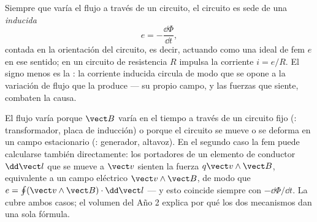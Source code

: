 \begin{theorem}\label{thm:b1:induction:faraday}
Siempre que varía el flujo a través de un circuito, el circuito es sede
de una \emph{ inducida}
\[
e = -\frac{\dd\Phi}{\dd t} ,
\]
contada en la orientación del circuito, es decir, actuando como una
 ideal de fem $e$ en ese sentido; en un circuito de
resistencia $R$ impulsa la corriente $i = e/R$. El signo menos es la
\emph{}: la corriente inducida circula de modo que se opone a
la variación de flujo que la produce --- su propio campo, y las fuerzas
que siente, combaten la causa.
\end{theorem}
\admitted

\begin{remark}\label{rem:b1:induction:twofaces}
El flujo varía porque $\vect B$ varía en el tiempo a través de un
circuito fijo (\emph{}: transformador, placa de
inducción) o porque el circuito se mueve o se deforma en un campo
estacionario (\emph{}: generador, altavoz). En el
segundo caso la fem puede calcularse también directamente: los
portadores de un elemento de conductor $\dd\vect l$ que se mueve a
$\vect v$ sienten la fuerza $q\vect v\wedge
\vect B$, equivalente a un campo eléctrico $\vect v\wedge\vect B$, de modo
que $e = \oint(\vect v\wedge\vect B)\cdot\dd\vect l$ --- y esto coincide
siempre con $-\dd\Phi/\dd t$. La  cubre ambos casos; el
volumen del Año 2 explica por qué los dos mecanismos dan una sola fórmula.
\end{remark}

